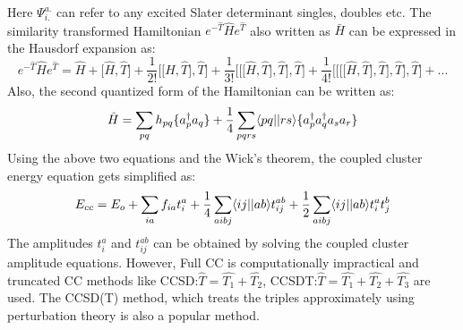 Here $\Psi^{a.}_{i.}$ can refer to any excited Slater determinant singles, doubles etc. 
The similarity transformed Hamiltonian $e^{-\hat{T}}\hat{H}e^{\hat{T}}$ also
written as $\bar{H}$ can be expressed in the Hausdorf expansion
\cite{Merzbacher70}as:
\begin{equation}
e^{-\hat{T}}\hat{H}e^{\hat{T}} = \hat{H} + \lbrack\hat{H},\hat{T}\rbrack + \frac{1}{2!}\lbrack\lbrack\hat{H},\hat{T}\rbrack,\hat{T}\rbrack + \frac{1}{3!}\lbrack\lbrack\lbrack\hat{H},\hat{T}\rbrack,\hat{T}\rbrack,\hat{T}\rbrack + \frac{1}{4!}\lbrack\lbrack\lbrack\lbrack\hat{H},\hat{T}\rbrack,\hat{T}\rbrack,\hat{T}\rbrack,\hat{T}\rbrack + ...
\end{equation}
Also, the second quantized form of the Hamiltonian can be written as\cite{Crawford00}:
\begin{equation}
\hat{H} = \sum_{pq}h_{pq}\{a^\dagger_pa_q\} + \frac{1}{4}\sum_{pqrs}\langle pq || rs \rangle\{a^\dagger_pa^\dagger_qa_sa_r\}
\end{equation}
Using the above two equations and the Wick's theorem\cite{Wick50}, the coupled cluster energy
equation gets simplified as:
\begin{equation}
E_{cc} = E_o + \sum_{ia}f_{ia}t^a_i + \frac{1}{4}\sum_{aibj}\langle ij || ab \rangle t^{ab}_{ij} + \frac{1}{2}\sum_{aibj}\langle ij || ab \rangle t^a_it^b_j
\end{equation} The amplitudes $t^a_i$ and $t^{ab}_{ij}$ can be obtained by
solving the coupled cluster amplitude equations. However, Full CC is
computationally impractical and truncated CC methods like CCSD:\;$\hat{T} =
\hat{T_1} + \hat{T_2}$, CCSDT:\;$\hat{T} = \hat{T_1} + \hat{T_2} + \hat{T_3}$ 
are used. The CCSD(T)\cite{Shen12} method, which treats the triples approximately using
perturbation theory is also a popular method.
